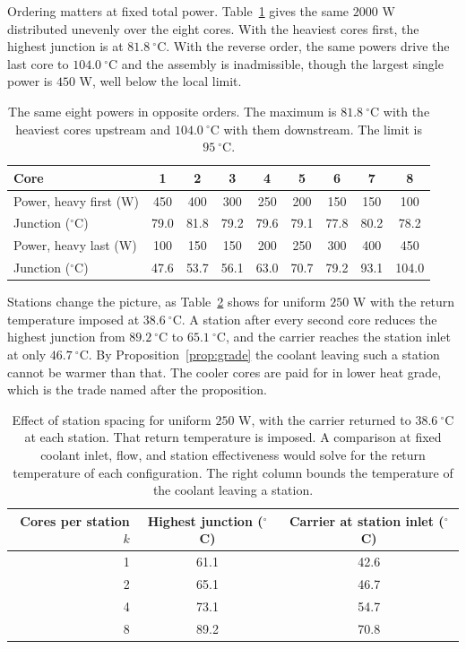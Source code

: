 \documentclass[11pt]{article}
\theoremstyle{definition}
\theoremstyle{plain}
\theoremstyle{remark}
\begin{document}
Ordering matters at fixed total power. Table~\ref{tab:order} gives the same $2000$ W distributed unevenly over the eight cores. With the heaviest cores first, the highest junction is at $81.8\ ^\circ$C. With the reverse order, the same powers drive the last core to $104.0\ ^\circ$C and the assembly is inadmissible, though the largest single power is $450$ W, well below the local limit.

\begin{table}[t]
\centering
\small
\begin{tabular}{@{}lcccccccc@{}}
\toprule
Core & 1 & 2 & 3 & 4 & 5 & 6 & 7 & 8 \\
\midrule
Power, heavy first (W) & 450 & 400 & 300 & 250 & 200 & 150 & 150 & 100 \\
Junction ($^\circ$C) & 79.0 & 81.8 & 79.2 & 79.6 & 79.1 & 77.8 & 80.2 & 78.2 \\
\midrule
Power, heavy last (W) & 100 & 150 & 150 & 200 & 250 & 300 & 400 & 450 \\
Junction ($^\circ$C) & 47.6 & 53.7 & 56.1 & 63.0 & 70.7 & 79.2 & 93.1 & 104.0 \\
\bottomrule
\end{tabular}
\caption{The same eight powers in opposite orders. The maximum is $81.8\ ^\circ$C with the heaviest cores upstream and $104.0\ ^\circ$C with them downstream. The limit is $95\ ^\circ$C.}
\label{tab:order}
\end{table}

Stations change the picture, as Table~\ref{tab:stations} shows for uniform $250$ W with the return temperature imposed at $38.6\ ^\circ$C. A station after every second core reduces the highest junction from $89.2\ ^\circ$C to $65.1\ ^\circ$C, and the carrier reaches the station inlet at only $46.7\ ^\circ$C. By Proposition~\ref{prop:grade} the coolant leaving such a station cannot be warmer than that. The cooler cores are paid for in lower heat grade, which is the trade named after the proposition.

\begin{table}[t]
\centering
\small
\begin{tabular}{@{}rcc@{}}
\toprule
Cores per station $k$ & Highest junction ($^\circ$C) & Carrier at station inlet ($^\circ$C) \\
\midrule
1 & 61.1 & 42.6 \\
2 & 65.1 & 46.7 \\
4 & 73.1 & 54.7 \\
8 & 89.2 & 70.8 \\
\bottomrule
\end{tabular}
\caption{Effect of station spacing for uniform $250$ W, with the carrier returned to $38.6\ ^\circ$C at each station. That return temperature is imposed. A comparison at fixed coolant inlet, flow, and station effectiveness would solve for the return temperature of each configuration. The right column bounds the temperature of the coolant leaving a station.}
\label{tab:stations}
\end{table}
\end{document}
